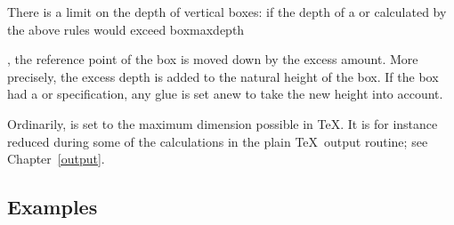 \documentclass{book}
\begin{document}
There is a limit on the depth of vertical boxes:
if the depth of a  or 
calculated by the above rules would exceed
\cstoidx boxmaxdepth\par,
the reference point of the box
is moved down by the excess amount.
More precisely, the excess depth is added to the
natural height of the box. If the box had a  or
 specification, any glue is set anew to take
the new height into account.

Ordinarily,
 is set to the maximum dimension
possible in \TeX. It is for instance reduced during some of
the calculations  in the plain \TeX\ output routine;
see Chapter~\ref{output}.

\subsection{Examples}
\end{document}
